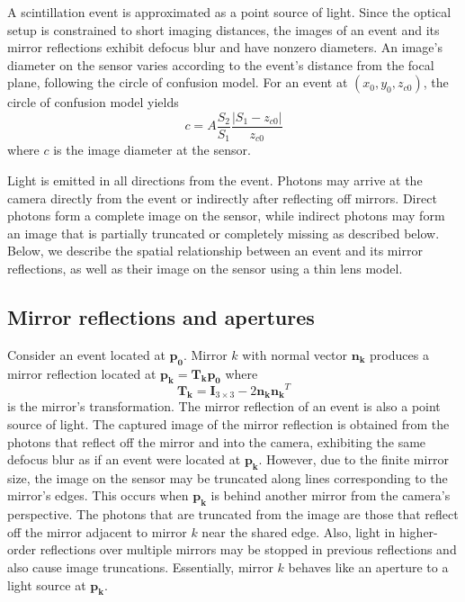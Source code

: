 
A scintillation event is approximated as a point source of light.
Since the optical setup is constrained to short imaging distances, 
the images of an event and its mirror reflections exhibit defocus blur and 
have nonzero diameters.
An image's diameter on the sensor varies according to the event's distance from 
the focal plane, following the circle of confusion model.
For an event at $(x_0,y_0,z_{c0})$, 
the circle of confusion model yields
\begin{equation} \label{eqn:circ_of_conf}
c=A\frac{S_2}{S_1}\frac{|S_1-z_{c0}|}{z_{c0}}
\end{equation}
where $c$ is the image diameter at the sensor.

Light is emitted in all directions from the event.
Photons may arrive at the camera directly from the event or indirectly after 
reflecting off mirrors.
Direct photons form a complete image on the sensor, while indirect photons may 
form an image that is partially truncated or completely missing as described below.
Below, we describe the spatial relationship between an event and its mirror 
reflections, as well as their image on the sensor using a thin lens model.

\subsection{Mirror reflections and apertures}

Consider an event located at $\bm{p_0}$.
Mirror $k$ with normal vector $\bm{n_k}$ produces a mirror reflection located at 
$\bm{p_k}=\bm{T_k}\bm{p_0}$
where
\begin{equation} \label{eqn:ref_trans}
\bm{T_k}=\bm{I}_{3\times3} - 2\bm{n_k}\bm{n_k}^T
\end{equation}
is the mirror's transformation.
The mirror reflection of an event is also a point source of light.
The captured image of the mirror reflection is obtained from the photons that 
reflect off the mirror and into the camera, exhibiting the same defocus blur as if 
an event were located at $\bm{p_k}$.
However, due to the finite mirror size, the image on the sensor may be truncated 
along lines corresponding to the mirror's edges.
This occurs when $\bm{p_k}$ is behind another mirror from the camera's perspective.
The photons that are truncated from the image are those that reflect off the 
mirror adjacent to mirror $k$ near the shared edge.
Also, light in higher-order reflections over multiple mirrors may be stopped 
in previous reflections and also cause image truncations.
Essentially, mirror $k$ behaves like an aperture to a light source at $\bm{p_k}$. 

